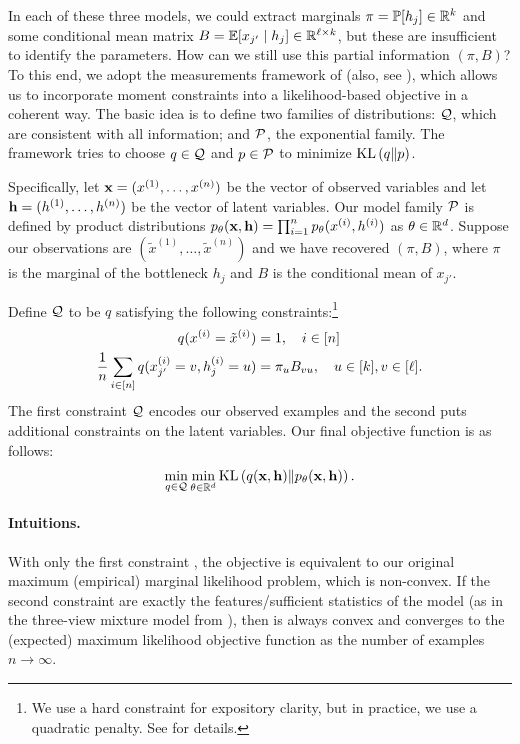 In each of these three models, we could extract marginals $\pi = \mathbb{P}[h_j] \in \mathbb{R}^{k}$
and some conditional mean matrix $B = \mathbb{E}[x_{j'} \mid h_j] \in \mathbb{R}^{\ell \times k}$,
but these are insufficient to identify the parameters.
How can we still use this partial information $(\pi,B)$?
To this end, we adopt the measurements framework of \citet{liang09measurements}
(also, see \cite{graca08em}),
which allows us to incorporate moment constraints into a likelihood-based objective in a coherent way.
The basic idea is to define two families of distributions:
$\mathcal{Q}$, which are consistent with all information; and
$\mathcal{P}$, the exponential family.  The
framework tries to choose $q \in \mathcal{Q}$ and $p \in \mathcal{P}$ to minimize
$\text{KL}\left( q \| p \right)$.

Specifically,
let $\mathbf{x} = (x^{(1)}, \dots, x^{(n)})$ be the vector of observed variables
and let
$\mathbf{h} = (h^{(1)}, \dots, h^{(n)})$ be the vector of latent variables.
Our model family $\mathcal{P}$ is defined by product distributions
$p_\theta(\mathbf{x},\mathbf{h}) = \prod_{i=1}^n p_\theta(x^{(i)}, h^{(i)})$ as $\theta \in \mathbb{R}^d$.
Suppose our observations are $(\tilde x^{(1)}, \dots, \tilde x^{(n)})$
and we have recovered $(\pi,B)$, where $\pi$ is the marginal of the bottleneck $h_j$ and $B$ is the conditional mean of $x_{j'}$.

Define $\mathcal{Q}$ to be $q$ satisfying the following constraints:\footnote{We use a hard constraint
for expository clarity, but in practice, we use a quadratic penalty.  See
\citet{liang09measurements} for details.}
\begin{align}
  q(x^{(i)} = \tilde x^{(i)}) &= 1, \quad i \in [n] \label{eqn:exConstraint} \\
  \frac{1}{n} \sum_{i \in [n]} q(x_{j'}^{(i)} = v, h_j^{(i)} = u) &= \pi_u B_{v u}, \quad u \in [k], v \in [\ell]. \label{eqn:momentConstraint}
\end{align}
The first constraint $\mathcal{Q}$ encodes our observed examples
and the second puts additional constraints on the latent variables.
Our final objective function is as follows:
\begin{align}
  \min_{q \in \mathcal{Q}} \min_{\theta \in \mathbb{R}^d} \text{KL}\left( q(\mathbf{x}, \mathbf{h}) \| p_\theta(\mathbf{x}, \mathbf{h}) \right). \label{eqn:minKL}
\end{align}
\paragraph{Intuitions.}
With only the first constraint , the objective
 is equivalent to our original maximum (empirical) marginal
likelihood problem, which is non-convex.  If the second constraint
 are exactly the features/sufficient statistics of the
model (as in the three-view mixture model from ),
then  is always convex and
converges to the (expected) maximum likelihood objective function as the number of examples $n \to\infty$.

